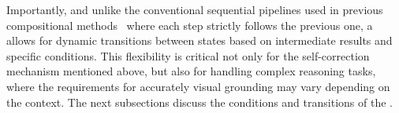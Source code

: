 Importantly, and unlike the conventional sequential pipelines used in previous compositional methods~\cite{ke_hydra_2024, shen_hugginggpt_2023, suris_vipergpt_2023, you_idealgpt_2023} where each step strictly follows the previous one, a \dfa{} allows for dynamic transitions between states based on intermediate results and specific conditions. This flexibility is critical not only for the self-correction mechanism mentioned above, but also for handling complex reasoning tasks, where the requirements for accurately visual grounding may vary depending on the context. %
The next subsections discuss the conditions and transitions of the \dfa{}.



